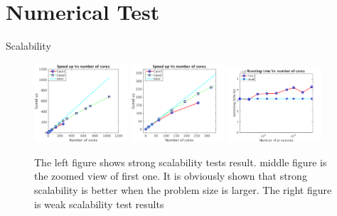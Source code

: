 \documentclass{beamer}
\begin{document}
\section{Numerical Test}
\begin{frame}{Scalability}
\begin{figure}
\flushleft
\includegraphics[width=0.31\textwidth]{../strong_scale}
\hfill
\includegraphics[width=0.31\textwidth]{../strong_scale_zoom}
\hfill
\includegraphics[width=0.31\textwidth]{../weak_scale}
\caption{The left figure shows strong scalability tests result. middle figure is the zoomed view of first one. It is obviously shown that strong scalability is better when the problem size is larger. The right figure is weak scalability test results}
\label{fig:2cases_efficiency}
\end{figure}
%
\end{frame}
\end{document}
